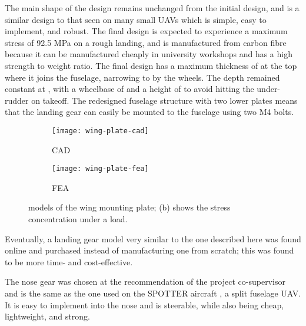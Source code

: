 \documentclass[../../main.tex]{subfiles}
\begin{document}
The main shape of the design remains unchanged from the initial design, and is a similar design to that seen on many small UAVs which is simple, easy to implement, and robust.
The final design is expected to experience a maximum stress of 92.5 MPa on a rough landing, and is manufactured from carbon fibre because it can be manufactured cheaply in university workshops and has a high strength to weight ratio.
The final design has a maximum thickness of  at the top where it joins the fuselage, narrowing to  by the wheels.
The depth remained constant at , with a wheelbase of  and a height of  to avoid hitting the under-rudder on takeoff.
The redesigned fuselage structure with two lower plates means that the landing gear can easily be mounted to the fuselage using two M4 bolts. 


\begin{figure}[H]

    \centering
    \begin{subfigure}[b]{0.49\columnwidth}
        \centering
        \texttt{[image: wing-plate-cad]}
        \caption{CAD}
        \label{fig:wing-plate:cad}
    \end{subfigure}
    \hfill
    \begin{subfigure}[b]{0.49\columnwidth}
        \centering
        \texttt{[image: wing-plate-fea]}
        \caption{FEA}
        \label{fig:wing-plate:fea}
    \end{subfigure}
    
    \caption{
        models of the wing mounting plate; (b) shows the stress concentration under a  load.
    }
    \label{fig:wing-plate}
\end{figure}


Eventually, a landing gear model very similar to the one described here was found online and purchased instead of manufacturing one from scratch; this was found to be more time- and cost-effective.

The nose gear was chosen at the recommendation of the project co-supervisor and is the same as the one used on the SPOTTER aircraft \cite{spotter-19}, a  split fuselage UAV.
It is easy to implement into the nose and is steerable, while also being cheap, lightweight, and strong. 
\end{document}

